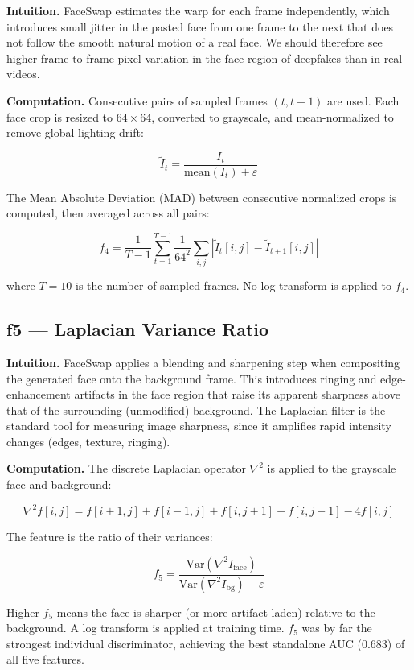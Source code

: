 \documentclass{article}
\begin{document}
\textbf{Intuition.} FaceSwap estimates the warp for each frame independently, which introduces small jitter in the pasted face from one frame to the next that does not follow the smooth natural motion of a real face. We should therefore see higher frame-to-frame pixel variation in the face region of deepfakes than in real videos.

\textbf{Computation.} Consecutive pairs of sampled frames $(t, t+1)$ are used. Each face crop is resized to $64\times64$, converted to grayscale, and mean-normalized to remove global lighting drift:

\[
  \tilde{I}_t = \frac{I_t}{\text{mean}(I_t) + \varepsilon}
\]

The Mean Absolute Deviation (MAD) between consecutive normalized crops is computed, then averaged across all pairs:

\[
  f_4 = \frac{1}{T-1} \sum_{t=1}^{T-1} \frac{1}{64^2}\sum_{i,j}\left|\tilde{I}_t[i,j] - \tilde{I}_{t+1}[i,j]\right|
\]

where $T = 10$ is the number of sampled frames. No log transform is applied to $f_4$.

\subsection*{f5 — Laplacian Variance Ratio}

\textbf{Intuition.} FaceSwap applies a blending and sharpening step when compositing the generated face onto the background frame. This introduces ringing and edge-enhancement artifacts in the face region that raise its apparent sharpness above that of the surrounding (unmodified) background. The Laplacian filter is the standard tool for measuring image sharpness, since it amplifies rapid intensity changes (edges, texture, ringing).

\textbf{Computation.} The discrete Laplacian operator $\nabla^2$ is applied to the grayscale face and background:

\[
  \nabla^2 f[i,j] = f[i+1,j] + f[i-1,j] + f[i,j+1] + f[i,j-1] - 4f[i,j]
\]

The feature is the ratio of their variances:

\[
  f_5 = \frac{\text{Var}(\nabla^2 I_{\text{face}})}{\text{Var}(\nabla^2 I_{\text{bg}}) + \varepsilon}
\]

Higher $f_5$ means the face is sharper (or more artifact-laden) relative to the background. A log transform is applied at training time. $f_5$ was by far the strongest individual discriminator, achieving the best standalone AUC (0.683) of all five features.
\end{document}
